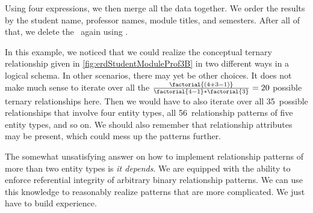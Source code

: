 Using four  expressions, we then merge all the data together.
We order the results by the student name, professor names, module titles, and semesters.
After all of that, we delete the \db\ again using .

In this example, we noticed that we could realize the conceptual ternary relationship given in \cref{fig:erdStudentModuleProf3B} in two different ways in a logical schema.
In other scenarios, there may yet be other choices.
It does not make much sense to iterate over all the $\frac{\factorial{(4+3-1)}}{\factorial{4-1}*\factorial{3}}=20$ possible ternary relationships here.
Then we would have to also iterate over all 35~possible relationships that involve four entity types, all 56~relationship patterns of five entity types, and so on.
We should also remember that relationship attributes may be present, which could mess up the patterns further.

The somewhat unsatisfying answer on how to implement relationship patterns of more than two entity types is \emph{it depends}.
We are equipped with the ability to enforce referential integrity of arbitrary binary relationship patterns.
We can use this knowledge to reasonably realize patterns that are more complicated.
We just have to build experience.%
\FloatBarrier%
\endhsection%
%
